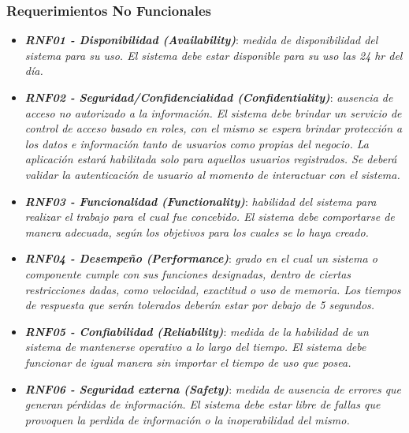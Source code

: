 \documentclass[11pt,oneside]{book}
\begin{document}
\subsubsection{Requerimientos No Funcionales}
\begin{itemize}

\item \textit{\textbf{RNF01 - Disponibilidad (Availability)}}: \textit{medida de disponibilidad del sistema para su uso. El sistema debe estar disponible para su uso las 24 hr del día.} %

\item \textit{\textbf{RNF02 - Seguridad/Confidencialidad (Confidentiality)}}: \textit{ausencia de acceso no autorizado a la información. El sistema debe brindar un servicio de control de acceso basado en roles, con el mismo se espera brindar protección a los datos e información tanto de usuarios como propias del negocio. La aplicación estará habilitada solo para aquellos usuarios registrados. Se deberá validar la autenticación de usuario al momento de interactuar con el sistema.} %

\item \textit{\textbf{RNF03 - Funcionalidad (Functionality)}}: \textit{habilidad del sistema para realizar el trabajo para el cual fue concebido. El sistema debe comportarse de manera adecuada, según los objetivos para los cuales se lo haya creado.} %

\item \textit{\textbf{RNF04 - Desempeño (Performance)}}: \textit{grado en el cual un sistema o componente cumple con sus funciones designadas, dentro de ciertas restricciones dadas, como velocidad, exactitud o uso de memoria. Los tiempos de respuesta que serán tolerados deberán estar por debajo de 5 segundos.} %

\item \textit{\textbf{RNF05 - Confiabilidad (Reliability)}}: \textit{medida de la habilidad de un sistema de mantenerse operativo a lo largo del tiempo. El sistema debe funcionar de igual manera sin importar el tiempo de uso que posea.} %

\item \textit{\textbf{RNF06 - Seguridad externa (Safety)}}: \textit{medida de ausencia de errores que generan pérdidas de información. El sistema debe estar libre de fallas que provoquen la perdida de información o la inoperabilidad del mismo.}%


\end{itemize}
\end{document}
